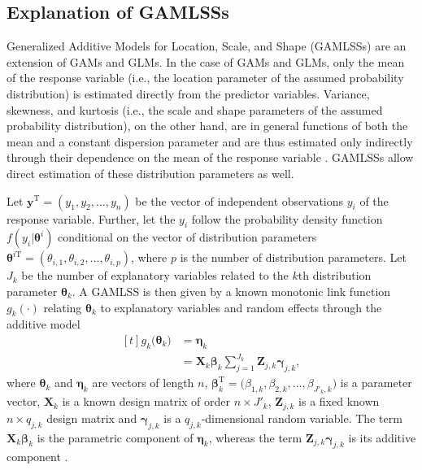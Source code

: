 \subsection{Explanation of GAMLSSs}

Generalized Additive Models for Location, Scale, and Shape (GAMLSSs) \parencite{Rigby2001,Akanztiliotou2002,Rigby2005} are an extension of GAMs and GLMs.  In the case of GAMs and GLMs, only the mean of the response variable (i.e., the location parameter of the assumed probability distribution) is estimated directly from the predictor variables.  Variance, skewness, and kurtosis (i.e., the scale and shape parameters of the assumed probability distribution), on the other hand, are in general functions of both the mean and a constant dispersion parameter and are thus estimated only indirectly through their dependence on the mean of the response variable \parencite{Rigby2001}.  GAMLSSs allow direct estimation of these distribution parameters as well.

Let \(\symbf{y}^{\text{T}} = (y_1, y_2, \ldots, y_n)\) be the vector of independent observations \(y_i\) of the response variable.  Further, let the \(y_i\) follow the probability density function \(f(y_i|\symbf{\theta}^i)\) conditional on the vector of distribution parameters \(\symbf{\theta}^{i \text{T}} = (\theta_{i, 1}, \theta_{i, 2}, \ldots, \theta_{i, p})\), where \(p\) is the number of distribution parameters. Let \(J_k\) be the number of explanatory variables related to the \(k\)th distribution parameter \(\symbf{\theta}_k\).  A GAMLSS is then given by a known monotonic link function \(g_k(\cdot)\) relating \(\symbf{\theta}_k\) to explanatory variables and random effects through the additive model 
\begin{equation}
  \label{eq:GAMLSSRigbyStasinopoulos2005}
  \begin{aligned}[t]
    g_k\bigl(\symbf{\theta}_k\bigr) &= \symbf{\eta}_k \\
    &= \symbf{X}_k \symbf{\beta}_k \sum_{j = 1}^{J_k} \symbf{Z}_{j, k} \symbf{\gamma}_{j, k},
\end{aligned}
\end{equation}
where \(\symbf{\theta}_k\) and \(\symbf{\eta}_k\) are vectors of length \(n\), \(\symbf{\beta}_k^{\text{T}} = \bigl(\beta_{1, k}, \beta_{2, k}, \ldots, \beta_{J'_k, k}\bigr)\) is a parameter vector, \(\symbf{X}_k\) is a known design matrix of order \(n \times J'_k\), \(\symbf{Z}_{j, k}\) is a fixed known \(n \times q_{j, k}\) design matrix and \(\symbf{\gamma}_{j, k}\) is a \(q_{j, k}\)-dimensional random variable.  The term \(\symbf{X}_k \symbf{\beta}_k\) is the parametric component of \(\symbf{\eta}_k\), whereas the term \(\symbf{Z}_{j, k} \symbf{\gamma}_{j, k}\) is its additive component \parencite{Rigby2005}.

